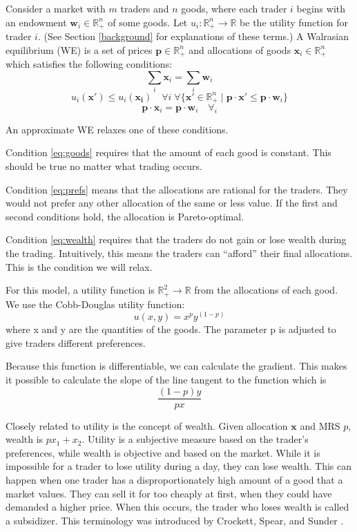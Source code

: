 \documentclass[12pt,a4paper,titlepage]{article}
\begin{document}
Consider a market with $m$ traders and $n$ goods, where each trader $i$ begins with an endowment $\mathbf{w}_i \in \mathbb{R}^n_+ $ of some goods.
Let $u_i : \mathbb{R}^n_+ \rightarrow \mathbb{R}$ be the utility function for trader $i$.
(See Section \ref{background} for explanations of these terms.)
A Walrasian equilibrium (WE) is a set of prices $\mathbf{p} \in \mathbb{R}^n_+$ and allocations of goods $\mathbf{x}_i \in \mathbb{R}^n_+$ which satisfies the following conditions:
\begin{equation}\label{eq:goods}
  \sum_i \mathbf{x}_i = \sum_i \mathbf{w}_i 
\end{equation}
\begin{equation}\label{eq:prefs}
  u_i(\mathbf{x'}) \leq u_i(\mathbf{x_i}) \quad
  \forall{i} \; \forall{\{\mathbf{x'} \in \mathbb{R}^n_+ \mid \mathbf{p} \cdot \mathbf{x'} \leq \mathbf{p} \cdot \mathbf{w}_i}\}
\end{equation}
\begin{equation}\label{eq:wealth}
  \mathbf{p} \cdot \mathbf{x}_i = \mathbf{p} \cdot \mathbf{w}_i \quad \forall_i 
\end{equation}

An approximate WE relaxes one of these conditions.

Condition \ref{eq:goods} requires that the amount of each good is constant.
This should be true no matter what trading occurs.

Condition \ref{eq:prefs} means that the allocations are rational for the traders.
They would not prefer any other allocation of the same or less value.
If the first and second conditions hold, the allocation is Pareto-optimal.

Condition \ref{eq:wealth} requires that the traders do not gain or lose wealth during the trading.
Intuitively, this means the traders can ``afford'' their final allocations.
This is the condition we will relax.

For this model, a utility function is $\mathbb{R}^2_+ \rightarrow \mathbb{R}$ from the allocations of each good.
We use the Cobb-Douglas utility function:
\[
  u(x, y) = x^p y^{(1-p)}
\]
where x and y are the quantities of the goods.
The parameter p is adjusted to give traders different preferences.

Because this function is differentiable, we can calculate the gradient.
This makes it possible to calculate the slope of the line tangent to the function which is 
\[
  \frac{(1-p)y}{px}
\]

Closely related to utility is the concept of wealth.
Given allocation $\mathbf{x}$ and MRS $p$, wealth is $ px_1 + x_2 $.
Utility is a subjective measure based on the trader's preferences, while wealth is objective and based on the market.
While it is impossible for a trader to lose utility during a day, they can lose wealth.
This can happen when one trader has a disproportionately high amount of a good that a market values.
They can sell it for too cheaply at first, when they could have demanded a higher price.
When this occurs, the trader who loses wealth is called a subsidizer.
This terminology was introduced by Crockett, Spear, and Sunder \cite{crockett}.
\end{document}
